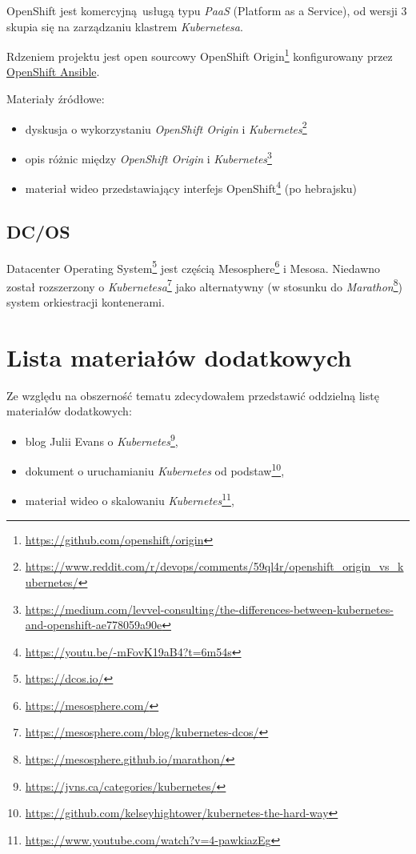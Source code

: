\documentclass[a4paper,12pt,twoside,openany]{report}
\providecommand{\tightlist}{%
  \setlength{\itemsep}{0pt}\setlength{\parskip}{0pt}}
\DeclareRobustCommand{\href}[2]{#2\footnote{\url{#1}}}
\begin{document}
OpenShift jest komercyjną~usługą typu \emph{PaaS} (Platform as a
Service), od wersji 3 skupia się na zarządzaniu klastrem
\emph{Kubernetesa}.

Rdzeniem projektu jest open sourcowy
\href{https://github.com/openshift/origin}{OpenShift Origin}
konfigurowany przez \protect\hyperlink{openshift-ansible}{OpenShift
Ansible}.

Materiały źródłowe:

\begin{itemize}
\tightlist
\item
  \href{https://www.reddit.com/r/devops/comments/59ql4r/openshift_origin_vs_kubernetes/}{dyskusja
  o wykorzystaniu \emph{OpenShift Origin} i \emph{Kubernetes}}
\item
  \href{https://medium.com/levvel-consulting/the-differences-between-kubernetes-and-openshift-ae778059a90e}{opis
  różnic między \emph{OpenShift Origin} i \emph{Kubernetes}}
\item
  \href{https://youtu.be/-mFovK19aB4?t=6m54s}{materiał wideo
  przedstawiający interfejs OpenShift} (po hebrajsku)
\end{itemize}

\hypertarget{dcos}{%
\subsection{DC/OS}\label{dcos}}

\href{https://dcos.io/}{Datacenter Operating System} jest częścią
\href{https://mesosphere.com/}{Mesosphere} i Mesosa. Niedawno został
rozszerzony o
\href{https://mesosphere.com/blog/kubernetes-dcos/}{\emph{Kubernetesa}}
jako alternatywny (w stosunku do
\href{https://mesosphere.github.io/marathon/}{\emph{Marathon}}) system
orkiestracji kontenerami.

\hypertarget{lista-materiaux142uxf3w-dodatkowych}{%
\section{Lista materiałów
dodatkowych}\label{lista-materiaux142uxf3w-dodatkowych}}

Ze względu na obszerność tematu zdecydowałem przedstawić oddzielną listę
materiałów dodatkowych:

\begin{itemize}
\tightlist
\item
  \href{https://jvns.ca/categories/kubernetes/}{blog Julii Evans o
  \emph{Kubernetes}},
\item
  \href{https://github.com/kelseyhightower/kubernetes-the-hard-way}{dokument
  o uruchamianiu \emph{Kubernetes} od podstaw},
\item
  \href{https://www.youtube.com/watch?v=4-pawkiazEg}{materiał wideo o
  skalowaniu \emph{Kubernetes}},
\end{itemize}
\end{document}
